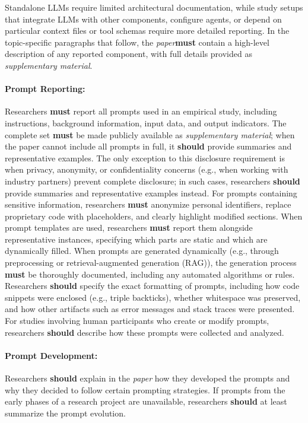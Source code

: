 \documentclass[smallextended]{svjour3}
\newcommand{\must}{\textbf{must}\xspace}
\newcommand{\should}{\textbf{should}\xspace}
\newcommand{\paper}{\emph{paper}\xspace}
\newcommand{\supplementarymaterial}{\emph{supplementary material}\xspace}
\newcommand{\paper}{\emph{paper}\xspace}
\newcommand{\supplementarymaterial}{\emph{supplementary material}\xspace}
\begin{document}
Standalone LLMs require limited architectural documentation, while study setups that integrate LLMs with other components, configure agents, or depend on particular context files or tool schemas require more detailed reporting. In the topic-specific paragraphs that follow, the \paper \must contain a high-level description of any reported component, with full details provided as \supplementarymaterial.

\paragraph{Prompt Reporting:}
Researchers \must report all prompts used in an empirical study, including instructions, background information, input data, and output indicators.
The complete set \must be made publicly available as \supplementarymaterial; when the paper cannot include all prompts in full, it \should provide summaries and representative examples.
The only exception to this disclosure requirement is when privacy, anonymity, or confidentiality concerns (e.g., when working with industry partners) prevent complete disclosure; in such cases, researchers \should provide summaries and representative examples instead.
For prompts containing sensitive information, researchers \must anonymize personal identifiers, replace proprietary code with placeholders, and clearly highlight modified sections.
When prompt templates are used, researchers \must report them alongside representative instances, specifying which parts are static and which are dynamically filled.
When prompts are generated dynamically (e.g., through preprocessing or retrieval-augmented generation (RAG)), the generation process \must be thoroughly documented, including any automated algorithms or rules.
Researchers \should specify the exact formatting of prompts, including how code snippets were enclosed (e.g., triple backticks), whether whitespace was preserved, and how other artifacts such as error messages and stack traces were presented.
For studies involving human participants who create or modify prompts, researchers \should describe how these prompts were collected and analyzed.

\paragraph{Prompt Development:}
Researchers \should explain in the \paper how they developed the prompts and why they decided to follow certain prompting strategies.
If prompts from the early phases of a research project are unavailable, researchers \should at least summarize the prompt evolution.
\end{document}
